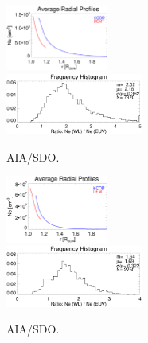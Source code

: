 \documentclass[baaa]{baaa}
\begin{document}
\begin{figure}
  \centering
  \includegraphics[width=0.3\textwidth]{figures/Average_Radial_Profiles_KCOR-Tom_vs_DEMT_CR2198_Hh_l45_kcor_subreg-Quiet-region1.eps}\\
  \includegraphics[width=0.4\textwidth]{figures/comparison_KCOR-Tom_vs_DEMT_CR2198_Hh_l45_kcor_subreg-Quiet-region1_range1105-1195_Rsun.eps}	
  \caption{AIA/SDO.}
  \label{fig_averages}
\end{figure}

\begin{figure}
  \centering
  \includegraphics[width=0.3\textwidth]{figures/Average_Radial_Profiles_KCOR-Tom_vs_DEMT_CR2198_Hh_l45_kcor_subreg-Open-region_N.eps}\\
  \includegraphics[width=0.4\textwidth]{figures/comparison_KCOR-Tom_vs_DEMT_CR2198_Hh_l45_kcor_subreg-Open-region_N_range1105-1155_Rsun.eps}	
  \caption{AIA/SDO.}
  \label{fig_comparisson}
\end{figure}
\end{document}
